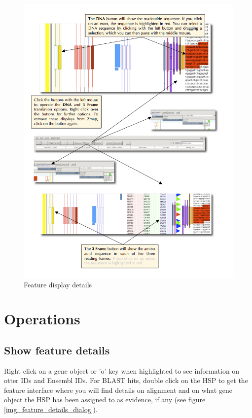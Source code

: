 \documentclass[letterpaper]{article}
\begin{document}
\begin{figure}
\centering
\color[rgb]{0.30980393,0.5058824,0.7411765}
\includegraphics[width=15.231cm]{img_feature_display_details.png}
\caption{Feature display details}
\label{img_feature_display_details}
\end{figure}


\clearpage
\section{Operations}

\subsection{Show feature details}
Right click on a gene object or 'o' key when highlighted to see information on otter IDs and Ensembl IDs. For BLAST hits, double click on the HSP to get the feature interface where you will find details on alignment and on what gene object the HSP has been assigned to as evidence, if any (see figure \ref{img_feature_details_dialog}).
\end{document}
